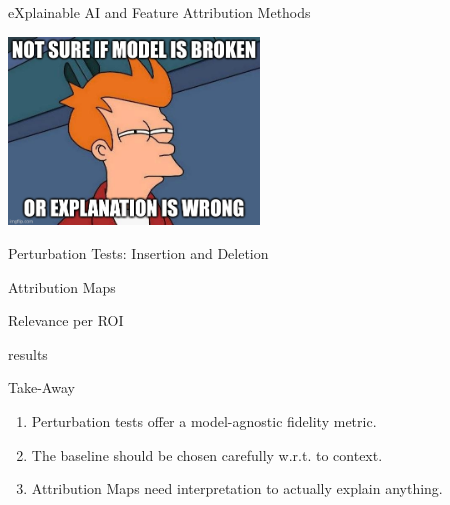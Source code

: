 \documentclass[aspectratio=169]{beamer}
\begin{document}
\begin{frame}{eXplainable AI and Feature Attribution Methods}
\end{frame}

\begin{frame}
	\begin{center}
		\includegraphics[width=0.5\textwidth]{figures/fry-and-xai.jpg}
	\end{center}
\end{frame}

\begin{frame}{Perturbation Tests: Insertion and Deletion}
\end{frame}

\begin{frame}{Attribution Maps}

\end{frame}

\begin{frame}{Relevance per ROI}

\end{frame}

\begin{frame}{results}
\end{frame}

\begin{frame}{Take-Away}
	\begin{enumerate}
		\item Perturbation tests offer a model-agnostic fidelity metric.
		\item The baseline should be chosen carefully w.r.t. to context.
		\item Attribution Maps need interpretation to actually explain anything.
	\end{enumerate}
\end{frame}
\end{document}
